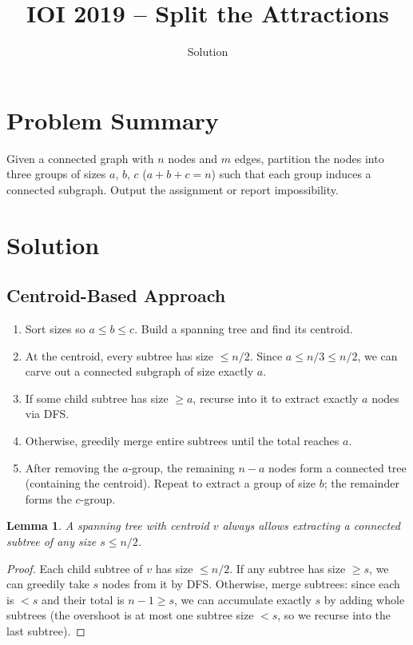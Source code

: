 \documentclass[11pt,a4paper]{article}
\title{IOI 2019 -- Split the Attractions}
\author{Solution}
\date{}
\newtheorem{lemma}{Lemma}
\begin{document}
\maketitle

\section{Problem Summary}
Given a connected graph with $n$ nodes and $m$ edges, partition the nodes into three groups of sizes $a$, $b$, $c$ ($a + b + c = n$) such that each group induces a connected subgraph. Output the assignment or report impossibility.

\section{Solution}

\subsection{Centroid-Based Approach}
\begin{enumerate}
  \item Sort sizes so $a \le b \le c$. Build a spanning tree and find its centroid.
  \item At the centroid, every subtree has size $\le n/2$. Since $a \le n/3 \le n/2$, we can carve out a connected subgraph of size exactly $a$.
  \item If some child subtree has size $\ge a$, recurse into it to extract exactly $a$ nodes via DFS.
  \item Otherwise, greedily merge entire subtrees until the total reaches $a$.
  \item After removing the $a$-group, the remaining $n - a$ nodes form a connected tree (containing the centroid). Repeat to extract a group of size $b$; the remainder forms the $c$-group.
\end{enumerate}

\begin{lemma}
A spanning tree with centroid $v$ always allows extracting a connected subtree of any size $s \le n/2$.
\end{lemma}
\begin{proof}
Each child subtree of $v$ has size $\le n/2$. If any subtree has size $\ge s$, we can greedily take $s$ nodes from it by DFS. Otherwise, merge subtrees: since each is $< s$ and their total is $n - 1 \ge s$, we can accumulate exactly $s$ by adding whole subtrees (the overshoot is at most one subtree size $< s$, so we recurse into the last subtree).
\end{proof}
\end{document}

